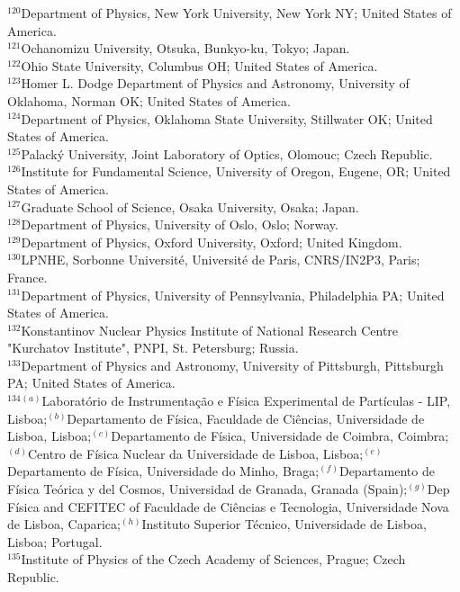 \begin{flushleft}
$^{120}$Department of Physics, New York University, New York NY; United States of America.\\
$^{121}$Ochanomizu University, Otsuka, Bunkyo-ku, Tokyo; Japan.\\
$^{122}$Ohio State University, Columbus OH; United States of America.\\
$^{123}$Homer L. Dodge Department of Physics and Astronomy, University of Oklahoma, Norman OK; United States of America.\\
$^{124}$Department of Physics, Oklahoma State University, Stillwater OK; United States of America.\\
$^{125}$Palack\'y University, Joint Laboratory of Optics, Olomouc; Czech Republic.\\
$^{126}$Institute for Fundamental Science, University of Oregon, Eugene, OR; United States of America.\\
$^{127}$Graduate School of Science, Osaka University, Osaka; Japan.\\
$^{128}$Department of Physics, University of Oslo, Oslo; Norway.\\
$^{129}$Department of Physics, Oxford University, Oxford; United Kingdom.\\
$^{130}$LPNHE, Sorbonne Universit\'e, Universit\'e de Paris, CNRS/IN2P3, Paris; France.\\
$^{131}$Department of Physics, University of Pennsylvania, Philadelphia PA; United States of America.\\
$^{132}$Konstantinov Nuclear Physics Institute of National Research Centre "Kurchatov Institute", PNPI, St. Petersburg; Russia.\\
$^{133}$Department of Physics and Astronomy, University of Pittsburgh, Pittsburgh PA; United States of America.\\
$^{134}$$^{(a)}$Laborat\'orio de Instrumenta\c{c}\~ao e F\'isica Experimental de Part\'iculas - LIP, Lisboa;$^{(b)}$Departamento de F\'isica, Faculdade de Ci\^{e}ncias, Universidade de Lisboa, Lisboa;$^{(c)}$Departamento de F\'isica, Universidade de Coimbra, Coimbra;$^{(d)}$Centro de F\'isica Nuclear da Universidade de Lisboa, Lisboa;$^{(e)}$Departamento de F\'isica, Universidade do Minho, Braga;$^{(f)}$Departamento de F\'isica Te\'orica y del Cosmos, Universidad de Granada, Granada (Spain);$^{(g)}$Dep F\'isica and CEFITEC of Faculdade de Ci\^{e}ncias e Tecnologia, Universidade Nova de Lisboa, Caparica;$^{(h)}$Instituto Superior T\'ecnico, Universidade de Lisboa, Lisboa; Portugal.\\
$^{135}$Institute of Physics of the Czech Academy of Sciences, Prague; Czech Republic.\\
$$
\end{flushleft}

